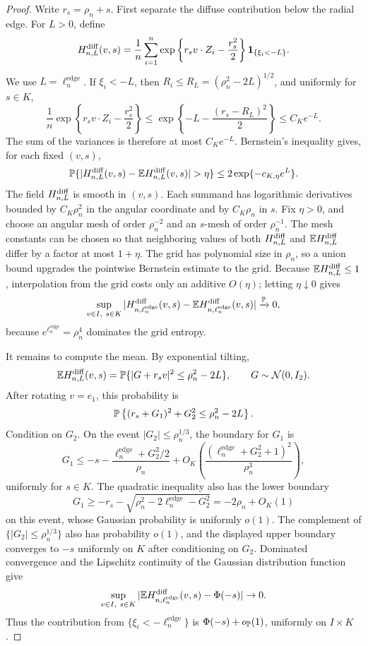 \begin{proof}
Write \(r_s=\rho_n+s\).  First separate the diffuse contribution below the
radial edge.  For \(L>0\), define
\[
    H^{\rm diff}_{n,L}(v,s)
    =
    \frac1n\sum_{i=1}^n
    \exp\left\{r_sv\cdot Z_i-\frac{r_s^2}{2}\right\}
    \mathbf 1_{\{\xi_i<-L\}} .
\]
We use \(L=\ell_n^{\mathrm{edge}}\).  If \(\xi_i<-L\), then \(R_i\le R_L=(\rho_n^2-2L)^{1/2}\), and uniformly for \(s\in K\),
\[
    \frac1n\exp\left\{r_sv\cdot Z_i-\frac{r_s^2}{2}\right\}
    \le
    \exp\left\{-L-\frac{(r_s-R_L)^2}{2}\right\}
    \le C_K e^{-L}.
\]
The sum of the variances is therefore at most \(C_Ke^{-L}\).  Bernstein's inequality gives, for each fixed \((v,s)\),
\[
    \Pbb\{|H^{\rm diff}_{n,L}(v,s)-\E H^{\rm diff}_{n,L}(v,s)|>\eta\}
    \le
    2\exp\{-c_{K,\eta}e^L\}.
\]
The field \(H^{\rm diff}_{n,L}\) is smooth in \((v,s)\). Each summand has
logarithmic derivatives bounded by \(C_K\rho_n^2\) in the angular coordinate
and by \(C_K\rho_n\) in \(s\). Fix \(\eta>0\), and choose an angular mesh of
order \(\rho_n^{-2}\) and an \(s\)-mesh of order \(\rho_n^{-1}\). The mesh
constants can be chosen so that neighboring values of both
\(H^{\rm diff}_{n,L}\) and \(\mathbb E H^{\rm diff}_{n,L}\) differ by a factor at
most \(1+\eta\). The grid has polynomial size in \(\rho_n\), so a union bound
upgrades the pointwise Bernstein estimate to the grid. Because
\(\mathbb E H^{\rm diff}_{n,L}\le1\), interpolation from the grid costs only an
additive \(O(\eta)\); letting \(\eta\downarrow0\) gives
\[
    \sup_{v\in I,\ s\in K}
    |H^{\rm diff}_{n,\ell_n^{\mathrm{edge}}}(v,s)-\mathbb E H^{\rm diff}_{n,\ell_n^{\mathrm{edge}}}(v,s)|
    \xrightarrow{\mathbb P}0,
\]
because \(e^{\ell_n^{\mathrm{edge}}}=\rho_n^4\) dominates the grid entropy.

It remains to compute the mean.  By exponential tilting,
\[
    \mathbb E H^{\rm diff}_{n,L}(v,s)
    =
    \mathbb P\{|G+r_sv|^2\le \rho_n^2-2L\},
    \qquad G\sim\mathcal N(0,I_2).
\]
After rotating \(v=e_1\), this probability is
\[
    \mathbb P\left\{(r_s+G_1)^2+G_2^2\le \rho_n^2-2L\right\}.
\]
Condition on \(G_2\).  On the event \(|G_2|\le\rho_n^{1/3}\), the boundary for \(G_1\) is
\[
    G_1
    \le
    -s-\frac{\ell_n^{\mathrm{edge}}+G_2^2/2}{\rho_n}
    +O_K\left(\frac{(\ell_n^{\mathrm{edge}}+G_2^2+1)^2}{\rho_n^3}\right),
\]
uniformly for \(s\in K\). The quadratic inequality also has the lower
boundary
\[
 G_1\ge-r_s-\sqrt{\rho_n^2-2\ell_n^{\mathrm{edge}}-G_2^2}
       =-2\rho_n+O_K(1)
\]
on this event, whose Gaussian probability is uniformly \(o(1)\). The
complement of \(\{|G_2|\le\rho_n^{1/3}\}\) also has probability \(o(1)\),
and the displayed upper boundary converges to \(-s\) uniformly on \(K\)
after conditioning on \(G_2\). Dominated convergence and the Lipschitz
continuity of the Gaussian distribution function give
\[
    \sup_{v\in I,\ s\in K}
    |\E H^{\rm diff}_{n,\ell_n^{\mathrm{edge}}}(v,s)-\Phi(-s)|\to0 .
\]
Thus the contribution from \(\{\xi_i<-\ell_n^{\mathrm{edge}}\}\) is \(\Phi(-s)+o_{\mathbb P}(1)\), uniformly on \(I\times K\).


\end{proof}
